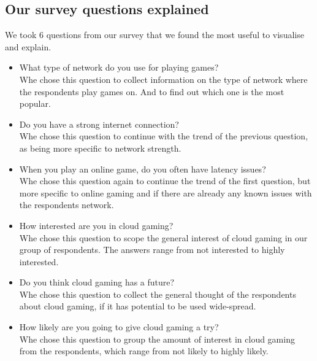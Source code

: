 \subsection{Our survey questions explained}
We took 6 questions from our survey that we found the most useful to visualise and explain.
\begin{itemize}
	\item What type of network do you use for playing games?
	\\Whe chose this question to collect information on the type of network where the respondents play games on. And to find out which one is the most popular.
	\item Do you have a strong internet connection?
	\\Whe chose this question to continue with the trend of the previous question, as being more specific to network strength.
	\item When you play an online game, do you often have latency issues?
	\\Whe chose this question again to continue the trend of the first question, but more specific to online gaming and if there are already any known issues with the respondents network.
	\item How interested are you in cloud gaming?
	\\Whe chose this question to scope the general interest of cloud gaming in our group of respondents. The answers range from not interested to highly interested.
	\item Do you think cloud gaming has a future?
	\\Whe chose this question to collect the general thought of the respondents about cloud gaming, if it has potential to be used wide-spread.
	\item How likely are you going to give cloud gaming a try?
	\\Whe chose this question to group the amount of interest in cloud gaming from the respondents, which range from not likely to highly likely.
\end{itemize}